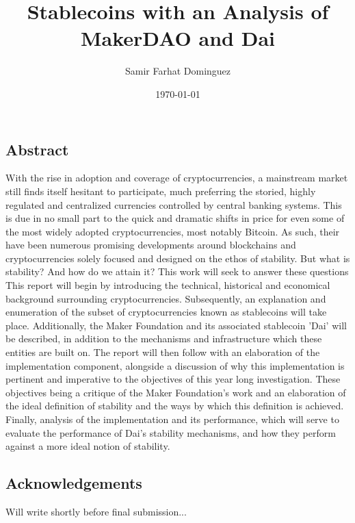 \documentclass[bsc,frontabs,singlespacing,parskip,deptreport]{infthesis}
\begin{document}
\begin{preliminary}

\title{Stablecoins with an Analysis of MakerDAO and Dai}

\author{Samir Farhat Dominguez}



\date{\today}

\maketitle

\chapter*{Abstract}
With the rise in adoption and coverage of cryptocurrencies, a mainstream market still finds itself hesitant to participate, much preferring the storied, highly regulated and centralized currencies controlled by central banking systems. This is due in no small part to the quick and dramatic shifts in price for even some of the most widely adopted cryptocurrencies, most notably Bitcoin. As such, their have been numerous promising developments around blockchains and cryptocurrencies solely focused and designed on the ethos of stability. But what is stability? And how do we attain it? This work will seek to answer these questions
\smallbreak
\noindent
This report will begin by introducing the technical, historical and economical background surrounding cryptocurrencies. Subsequently, an explanation and enumeration of the subset of cryptocurrencies known as stablecoins will take place. Additionally, the Maker Foundation and its associated stablecoin 'Dai' will be described, in addition to the mechanisms and infrastructure which these entities are built on. The report will then follow with an elaboration of the implementation component, alongside a discussion of why this implementation is pertinent and imperative to the objectives of this year long investigation. These objectives being a critique of the Maker Foundation's work and an elaboration of the ideal definition of stability and the ways by which this definition is achieved. Finally, analysis of the implementation and its performance, which will serve to evaluate the performance of Dai's stability mechanisms, and how they perform against a more ideal notion of stability. 
\newpage

\section*{Acknowledgements}
Will write shortly before final submission...

\tableofcontents
\end{preliminary}
\end{document}
